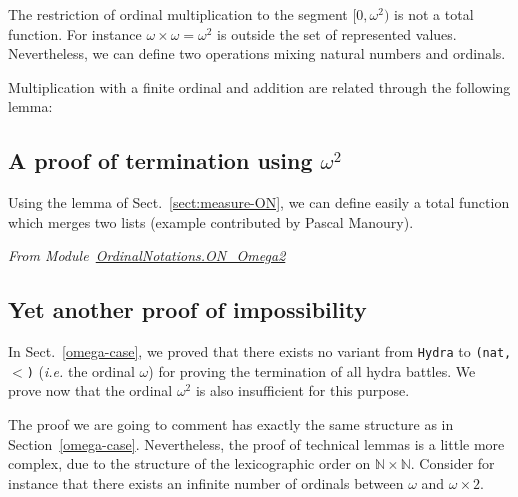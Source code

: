 The restriction of ordinal multiplication to the segment $[0,\omega^2)$ is not a total function.
For instance $\omega\times\omega= \omega^2$ is outside the set of represented values.
Nevertheless, we can define two operations mixing natural numbers and ordinals.





Multiplication with a finite ordinal and addition are related through the following lemma:

 

\subsection{A proof of termination using \texorpdfstring{$\omega^2$}{omega^2}} 
\label{sect:merge-example}

Using the lemma of Sect.~\vref{sect:measure-ON}, we can define easily a total function which merges two lists (example contributed by Pascal Manoury).


\vspace{4pt}
\noindent\emph{From Module~\href{../theories/html/hydras.OrdinalNotations.ON_Omega2.html}{OrdinalNotations.ON\_Omega2}}


 

\subsection{Yet another  proof of impossibility}
\label{omega2-case}

In Sect.~\vref{omega-case}, we proved that there exists no variant from \texttt{Hydra} to \texttt{(nat,$<$)}
(\emph{i.e.} the ordinal $\omega$) for proving the termination of all hydra battles.
We  prove now that  the ordinal $\omega^2$ is also insufficient for this purpose. 

The proof we are going to comment has exactly the same structure as in Section~\ref{omega-case}.
 Nevertheless, the proof of technical  lemmas is a little more complex, due to 
 the structure of the lexicographic order on $\mathbb{N}\times\mathbb{N}$. 
Consider for instance that there exists an infinite number of ordinals  between
$\omega$ and $\omega\times 2$.



